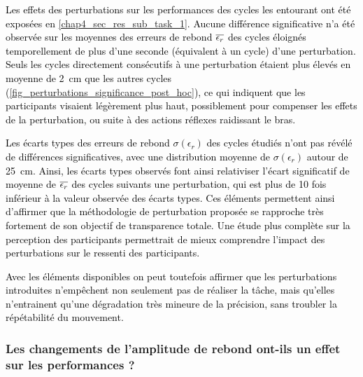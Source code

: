 \textcolor{black}{Les effets des perturbations sur les performances des cycles les entourant ont été exposées en \cref{chap4_sec_res_sub_task_1}. Aucune différence significative n'a été observée sur les moyennes des erreurs de rebond $\overline{\epsilon_r}$ des cycles éloignés temporellement de plus d'une seconde (équivalent à un cycle) d'une perturbation. Seuls les cycles directement consécutifs à une perturbation étaient plus élevés en moyenne de \SI{2}{\centi\meter} que les autres cycles (\cref{fig_perturbations_significance_post_hoc}), ce qui indiquent que les participants visaient légèrement plus haut, possiblement pour compenser les effets de la perturbation, ou suite à des actions réflexes raidissant le bras.}

\textcolor{black}{Les écarts types des erreurs de rebond $\sigma(\epsilon_r)$ des cycles étudiés n'ont pas révélé de différences significatives, avec une distribution moyenne de $\sigma(\epsilon_r)$ autour de \SI{25}{\centi\meter}. %
Ainsi, les écarts types observés font ainsi relativiser l'écart significatif de moyenne de $\overline{\epsilon_r}$ des cycles suivants une perturbation, qui est plus de 10 fois inférieur à la valeur observée des écarts types. Ces éléments permettent ainsi d'affirmer que la méthodologie de perturbation proposée se rapproche très fortement de son objectif de transparence totale. Une étude plus complète sur la perception des participants permettrait de mieux comprendre l'impact des perturbations sur le ressenti des participants.}

\textcolor{black}{Avec les éléments disponibles on peut toutefois affirmer que les perturbations introduites n'empêchent non seulement pas de réaliser la tâche, mais qu'elles n'entrainent qu'une dégradation très mineure de la précision, sans troubler la répétabilité du mouvement.}

\subsubsection{Les changements de l'amplitude de rebond ont-ils un effet sur les performances ?}

